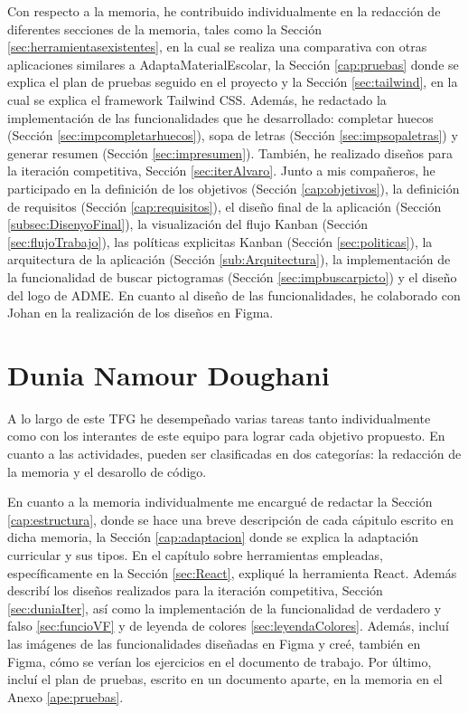 Con respecto a la memoria, he contribuido individualmente en la redacción de diferentes secciones de la memoria, tales como la Sección \ref{sec:herramientasexistentes}, en la cual se realiza una comparativa con otras aplicaciones similares a AdaptaMaterialEscolar, la Sección \ref{cap:pruebas} donde se explica el plan de pruebas seguido en el proyecto y la Sección \ref{sec:tailwind}, en la cual se explica el framework Tailwind CSS. Además, he redactado la implementación de las funcionalidades que he desarrollado: completar huecos (Sección \ref{sec:impcompletarhuecos}), sopa de letras (Sección \ref{sec:impsopaletras}) y generar resumen (Sección \ref{sec:impresumen}). También, he realizado diseños para la iteración competitiva, Sección \ref{sec:iterAlvaro}. Junto a mis compañeros, he participado en la definición de los objetivos (Sección \ref{cap:objetivos}), la definición de requisitos (Sección \ref{cap:requisitos}), el diseño final de la aplicación (Sección \ref{subsec:DisenyoFinal}), la visualización del flujo Kanban (Sección \ref{sec:flujoTrabajo}), las políticas explicitas Kanban (Sección \ref{sec:politicas}), la arquitectura de la aplicación (Sección \ref{sub:Arquitectura}), la implementación de la funcionalidad de buscar pictogramas (Sección \ref{sec:impbuscarpicto}) y el diseño del logo de ADME. En cuanto al diseño de las funcionalidades, he colaborado con Johan en la realización de los diseños en Figma.

\section{Dunia Namour Doughani}
A lo largo de este TFG he desempeñado varias tareas tanto individualmente como con los interantes de este equipo para lograr cada objetivo propuesto. En cuanto a las actividades, pueden ser clasificadas en dos categorías: la redacción de la memoria y el desarollo de código.

En cuanto a la memoria individualmente me encargué de redactar 
la Sección \ref{cap:estructura}, donde se hace una breve descripción de cada cápitulo escrito en dicha memoria, la Sección \ref{cap:adaptacion} donde se explica la adaptación curricular y sus tipos. En el capítulo sobre herramientas empleadas, específicamente en la Sección \ref{sec:React}, expliqué la herramienta React. Además describí los diseños realizados para la iteración competitiva, Sección \ref{sec:duniaIter}, así como la implementación de la funcionalidad de verdadero y falso \ref{sec:funcioVF} y de leyenda de colores \ref{sec:leyendaColores}. Además, incluí las imágenes de las funcionalidades diseñadas en Figma y creé, también en Figma, cómo se verían los ejercicios en el documento de trabajo. 
Por último, incluí el plan de pruebas, escrito en un documento aparte, en la memoria en el Anexo \ref{ape:pruebas}.


